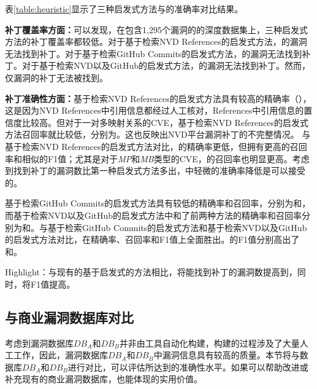 表\ref{table:heuristic}显示了三种启发式方法与\tool 的准确率对比结果。

\textbf{补丁覆盖率方面：}可以发现，在包含1,295个漏洞的的深度数据集上，三种启发式方法的补丁覆盖率都较低。对于基于检索NVD References的启发式方法，的漏洞无法找到补丁。对于基于检索GitHub Commits的启发式方法，的漏洞无法找到补丁。对于基于检索NVD以及GitHub的启发式方法，的漏洞无法找到补丁。然而，仅漏洞的补丁无法被\tool 找到。

\textbf{补丁准确性方面：}基于检索NVD References的启发式方法具有较高的精确率（），这是因为NVD References中引用信息都经过人工核对，References中引用信息的置信度比较高。但对于一对多映射关系的CVE，基于检索NVD References的启发式方法召回率就比较低，分别为。这也反映出NVD平台漏洞补丁的不完整情况。
与基于检索NVD References的启发式方法对比，\tool 的精确率更低，但拥有更高的召回率和相似的F1值；尤其是对于\textit{MP}和\textit{MB}类型的CVE，\tool 的召回率也明显更高。考虑到\tool 找到补丁的漏洞数比第一种启发式方法多出，\tool 中轻微的准确率降低是可以接受的。

基于检索GitHub Commits的启发式方法具有较低的精确率和召回率，分别为和，而基于检索NVD以及GitHub的启发式方法中和了前两种方法的精确率和召回率分别为和。与基于检索GitHub Commits的启发式方法和基于检索NVD以及GitHub的启发式方法对比，\tool 在精确率、召回率和F1值上全面胜出。\tool 的F1值分别高出了和。

\begin{tcolorbox}[size=title,opacityfill=0.15]
Highlight：与现有的基于启发式的方法相比，\tool 将能找到补丁的漏洞数提高到，同时，将F1值提高。
\end{tcolorbox}


\subsection{与商业漏洞数据库对比}

考虑到漏洞数据库$DB_A$和$DB_B$并非由工具自动化构建，构建的过程涉及了大量人工工作，因此，漏洞数据库$DB_A$和$DB_B$中漏洞信息具有较高的质量。本节将\tool 与数据库$DB_A$和$DB_B$进行对比，可以评估\tool 所达到的准确性水平。如果\tool 可以帮助改进或补充现有的商业漏洞数据库，也能体现\tool 的实用价值。


